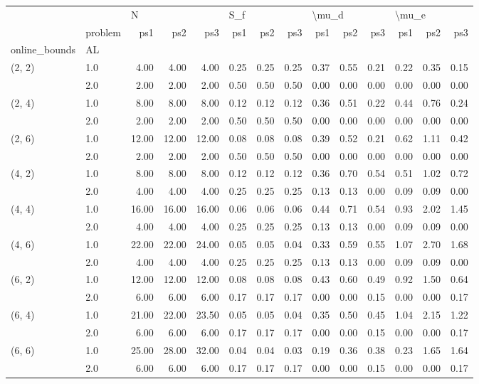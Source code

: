 \begin{tabular}{llrrrrrrrrrrrr}
\toprule
       & {} & \multicolumn{3}{l}{N} & \multicolumn{3}{l}{S\_f} & \multicolumn{3}{l}{\textbackslash mu\_d} & \multicolumn{3}{l}{\textbackslash mu\_e} \\
       & problem &   ps1 &   ps2 &   ps3 &  ps1 &  ps2 &  ps3 &   ps1 &  ps2 &  ps3 &   ps1 &  ps2 &  ps3 \\
online\_bounds & AL &       &       &       &      &      &      &       &      &      &       &      &      \\
\midrule
(2, 2) & 1.0 &  4.00 &  4.00 &  4.00 & 0.25 & 0.25 & 0.25 &  0.37 & 0.55 & 0.21 &  0.22 & 0.35 & 0.15 \\
       & 2.0 &  2.00 &  2.00 &  2.00 & 0.50 & 0.50 & 0.50 &  0.00 & 0.00 & 0.00 &  0.00 & 0.00 & 0.00 \\
(2, 4) & 1.0 &  8.00 &  8.00 &  8.00 & 0.12 & 0.12 & 0.12 &  0.36 & 0.51 & 0.22 &  0.44 & 0.76 & 0.24 \\
       & 2.0 &  2.00 &  2.00 &  2.00 & 0.50 & 0.50 & 0.50 &  0.00 & 0.00 & 0.00 &  0.00 & 0.00 & 0.00 \\
(2, 6) & 1.0 & 12.00 & 12.00 & 12.00 & 0.08 & 0.08 & 0.08 &  0.39 & 0.52 & 0.21 &  0.62 & 1.11 & 0.42 \\
       & 2.0 &  2.00 &  2.00 &  2.00 & 0.50 & 0.50 & 0.50 &  0.00 & 0.00 & 0.00 &  0.00 & 0.00 & 0.00 \\
(4, 2) & 1.0 &  8.00 &  8.00 &  8.00 & 0.12 & 0.12 & 0.12 &  0.36 & 0.70 & 0.54 &  0.51 & 1.02 & 0.72 \\
       & 2.0 &  4.00 &  4.00 &  4.00 & 0.25 & 0.25 & 0.25 &  0.13 & 0.13 & 0.00 &  0.09 & 0.09 & 0.00 \\
(4, 4) & 1.0 & 16.00 & 16.00 & 16.00 & 0.06 & 0.06 & 0.06 &  0.44 & 0.71 & 0.54 &  0.93 & 2.02 & 1.45 \\
       & 2.0 &  4.00 &  4.00 &  4.00 & 0.25 & 0.25 & 0.25 &  0.13 & 0.13 & 0.00 &  0.09 & 0.09 & 0.00 \\
(4, 6) & 1.0 & 22.00 & 22.00 & 24.00 & 0.05 & 0.05 & 0.04 &  0.33 & 0.59 & 0.55 &  1.07 & 2.70 & 1.68 \\
       & 2.0 &  4.00 &  4.00 &  4.00 & 0.25 & 0.25 & 0.25 &  0.13 & 0.13 & 0.00 &  0.09 & 0.09 & 0.00 \\
(6, 2) & 1.0 & 12.00 & 12.00 & 12.00 & 0.08 & 0.08 & 0.08 &  0.43 & 0.60 & 0.49 &  0.92 & 1.50 & 0.64 \\
       & 2.0 &  6.00 &  6.00 &  6.00 & 0.17 & 0.17 & 0.17 &  0.00 & 0.00 & 0.15 &  0.00 & 0.00 & 0.17 \\
(6, 4) & 1.0 & 21.00 & 22.00 & 23.50 & 0.05 & 0.05 & 0.04 &  0.35 & 0.50 & 0.45 &  1.04 & 2.15 & 1.22 \\
       & 2.0 &  6.00 &  6.00 &  6.00 & 0.17 & 0.17 & 0.17 &  0.00 & 0.00 & 0.15 &  0.00 & 0.00 & 0.17 \\
(6, 6) & 1.0 & 25.00 & 28.00 & 32.00 & 0.04 & 0.04 & 0.03 &  0.19 & 0.36 & 0.38 &  0.23 & 1.65 & 1.64 \\
       & 2.0 &  6.00 &  6.00 &  6.00 & 0.17 & 0.17 & 0.17 &  0.00 & 0.00 & 0.15 &  0.00 & 0.00 & 0.17 \\
\bottomrule
\end{tabular}
